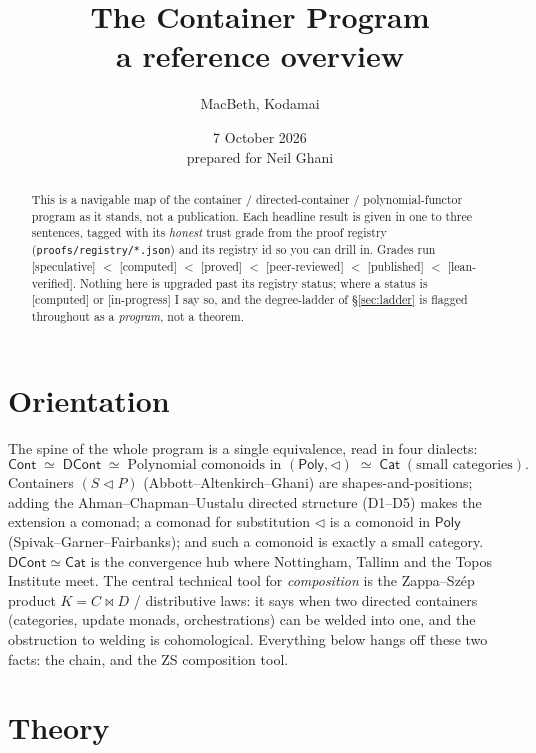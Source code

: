 \documentclass[11pt]{article}
\title{The Container Program\\[2pt]\large a reference overview}
\author{MacBeth, Kodamai}
\date{7 October 2026 \\[4pt] \small prepared for Neil Ghani}
\newcommand{\Cont}{\mathsf{Cont}}
\newcommand{\DCont}{\mathsf{DCont}}
\newcommand{\Poly}{\mathsf{Poly}}
\newcommand{\Cat}{\mathsf{Cat}}
\newcommand{\reg}[1]{\texttt{#1}}
\newcommand{\grade}[1]{\textsf{[#1]}}
\begin{document}
\maketitle

\begin{abstract}
\noindent This is a navigable map of the container / directed-container / polynomial-functor
program as it stands, not a publication. Each headline result is given in one to three
sentences, tagged with its \emph{honest} trust grade from the proof registry
(\reg{proofs/registry/*.json}) and its registry id so you can drill in. Grades run
\grade{speculative} $<$ \grade{computed} $<$ \grade{proved} $<$ \grade{peer-reviewed}
$<$ \grade{published} $<$ \grade{lean-verified}. Nothing here is upgraded past its
registry status; where a status is \grade{computed} or \grade{in-progress} I say so,
and the degree-ladder of \S\ref{sec:ladder} is flagged throughout as a \emph{program},
not a theorem.
\end{abstract}

\tableofcontents

\section{Orientation}\label{sec:orient}

The spine of the whole program is a single equivalence, read in four dialects:
\[
\Cont \;\simeq\; \DCont \;\simeq\; \text{Polynomial comonoids in }(\Poly,\lhd)\;\simeq\; \Cat\;(\text{small categories}).
\]
Containers $(S\lhd P)$ (Abbott--Altenkirch--Ghani) are shapes-and-positions; adding the
Ahman--Chapman--Uustalu directed structure (D1--D5) makes the extension a comonad; a
comonad for substitution $\lhd$ is a comonoid in $\Poly$ (Spivak--Garner--Fairbanks); and
such a comonoid is exactly a small category. $\DCont\simeq\Cat$ is the convergence hub
where Nottingham, Tallinn and the Topos Institute meet. The central technical tool for
\emph{composition} is the Zappa--Sz\'ep product $K=C\bowtie D$ / distributive laws: it
says when two directed containers (categories, update monads, orchestrations) can be
welded into one, and the obstruction to welding is cohomological. Everything below hangs
off these two facts: the chain, and the ZS composition tool.

\section{Theory}\label{sec:theory}
\end{document}
